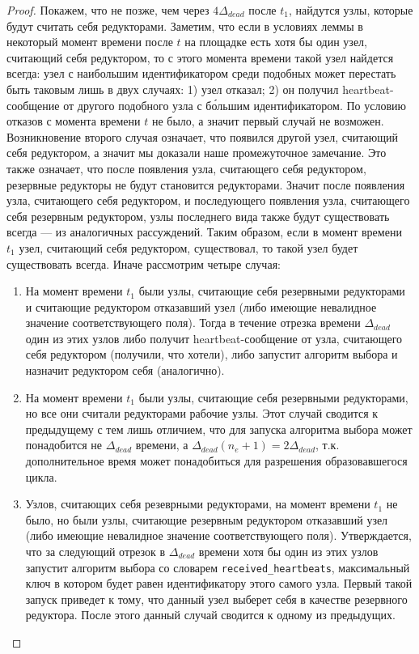 \documentclass{article}
\theoremstyle{plain}
\theoremstyle{plain}
\theoremstyle{plain}
\theoremstyle{plain}
\theoremstyle{definition}
\theoremstyle{remark}
\theoremstyle{plain}
\begin{document}
\begin{proof}
    Покажем, что не позже, чем через $4\Delta_{dead}$ после $t_1$, найдутся узлы, которые будут считать себя редукторами. Заметим, что если в условиях леммы в некоторый момент времени после $t$ на площадке есть хотя бы один узел, считающий себя редуктором, то с этого момента времени такой узел найдется всегда: узел с наибольшим идентификатором среди подобных может перестать быть таковым лишь в двух случаях: 1) узел отказал; 2) он получил heartbeat-со\-об\-ще\-ние от другого подобного узла с б\'{о}льшим идентификатором. По условию отказов с момента времени $t$ не было, а значит первый случай не возможен. Возникновение второго случая означает, что появился другой узел, считающий себя редуктором, а значит мы доказали наше промежуточное замечание. Это также означает, что после появления узла, считающего себя редуктором, резервные редукторы не будут становится редукторами. Значит после появления узла, считающего себя редуктором, и последующего появления узла, считающего себя резервным редуктором, узлы последнего вида также будут существовать всегда --- из аналогичных рассуждений. Таким образом, если в момент времени $t_1$ узел, считающий себя редуктором, существовал, то такой узел будет существовать всегда. Иначе рассмотрим четыре случая:
    
    \begin{enumerate}
        \item На момент времени $t_1$ были узлы, считающие себя резервными редукторами и считающие редуктором отказавший узел (либо имеющие невалидное значение соответствующего поля). Тогда в течение отрезка времени $\Delta_{dead}$ один из этих узлов либо получит heartbeat-со\-об\-ще\-ние от узла, считающего себя редуктором (получили, что хотели), либо запустит алгоритм выбора и назначит редуктором себя (аналогично).
        
        \item На момент времени $t_1$ были узлы, считающие себя резервными редукторами, но все они считали редукторами рабочие узлы. Этот случай сводится к предыдущему с тем лишь отличием, что для запуска алгоритма выбора может понадобится не $\Delta_{dead}$ времени, а $\Delta_{dead} (n_e + 1) = 2\Delta_{dead}$, т.к. дополнительное время может понадобиться для разрешения образовавшегося цикла.
    
        \item Узлов, считающих себя резеврными редукторами, на момент времени $t_1$ не было, но были узлы, считающие резервным редуктором отказавший узел (либо имеющие невалидное значение соответствующего поля). Утверждается, что за следующий отрезок в $\Delta_{dead}$ времени хотя бы один из этих узлов запустит алгоритм выбора со словарем \texttt{received\_heartbeats}, максимальный ключ в котором будет равен идентификатору этого самого узла. Первый такой запуск приведет к тому, что данный узел выберет себя в качестве резервного редуктора. После этого данный случай сводится к одному из предыдущих.
        

\end{enumerate}
\end{proof}
\end{document}
